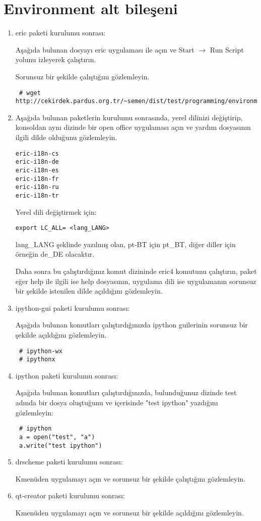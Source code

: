 \documentclass[a4paper,10pt]{article}
\begin{document}
\section{Environment alt bileşeni}
\begin{enumerate}
 \item eric paketi kurulumu sonrası:
 
Aşağıda bulunan dosyayı eric uygulaması ile açın ve Start $\rightarrow$ Run Script yolunu izleyerek çalıştırın. 

Sorunsuz bir şekilde çalıştığını gözlemleyin.
\begin{verbatim}
 # wget http://cekirdek.pardus.org.tr/~semen/dist/test/programming/environment/test.py
\end{verbatim}
 \item Aşağıda bulunan paketlerin kurulumu sonrasında, yerel dilinizi değiştirip, konsoldan aynı dizinde bir open office uygulaması açın ve yardım dosyasının ilgili dilde olduğunu gözlemleyin.
\begin{verbatim}
eric-i18n-cs
eric-i18n-de
eric-i18n-es
eric-i18n-fr
eric-i18n-ru
eric-i18n-tr
 \end{verbatim}

Yerel dili değiştirmek için:
\begin{verbatim}
export LC_ALL= <lang_LANG>
\end{verbatim}

lang\_LANG şeklinde yazılmış olan, pt-BT için pt\_BT, diğer diller için örneğin de\_DE olacaktır.

Daha sonra bu çalıştırdığınız komut dizininde eric4 komutunu çalıştırın, paket eğer help ile ilgili ise help dosyasının, uygulama dili ise uygulamanın sorunsuz bir şekilde istenilen dilde açıldığını gözlemleyin.

\item ipython-gui paketi kurulumu sonrası:

Aşağıda bulunan komutları çalıştırdığınızda ipython guilerinin sorunsuz bir şekilde açıldığını gözlemleyin.
\begin{verbatim}
 # ipython-wx
 # ipythonx
\end{verbatim}


\item ipython paketi kurulumu sonrası: 

Aşağıda bulunan komutları çalıştırdığınızda, bulunduğunuz dizinde test adında bir dosya oluştuğunu ve içerisinde "test ipython" yazdığını gözlemleyin:
\begin{verbatim}
 # ipython
 a = open("test", "a")
 a.write("test ipython")
\end{verbatim}

\item drscheme paketi kurulumu sonrası:

Kmenüden uygulamayı açın ve sorunsuz bir şekilde çalıştığını gözlemleyin.

\item qt-creator paketi kurulumu sonrası:

Kmenüden uygulamayı açın ve sorunsuz bir şekilde açıldığını gözlemleyin.
\end{enumerate}
\end{document}
